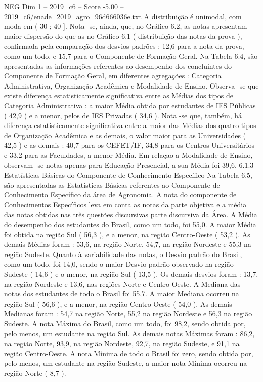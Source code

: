 \begin{textsample}{NEG Dim 1 – 2019\_c6 – Score -5.00 – 2019\_c6/enade\_2019\_agro\_96d666036e.txt}
A distribuição é unimodal, com moda em ( 30 ; 40 ].
Nota -se, ainda, que, no Gráfico 6.2, as notas apresentam maior dispersão do que as no Gráfico 6.1 ( distribuição das notas da prova ), confirmada pela comparação dos desvios padrões : 12,6 para a nota da prova, como um todo, e 15,7 para o Componente de Formação Geral.
Na Tabela 6.4, são apresentadas as informações referentes ao desempenho dos concluintes do Componente de Formação Geral, em diferentes agregações : Categoria Administrativa, Organização Acadêmica e Modalidade de Ensino.
Observa -se que existe diferença estatisticamente significativa entre as Médias dos tipos de Categoria Administrativa : a maior Média obtida por estudantes de IES Públicas ( 42,9 ) e a menor, pelos de IES Privadas ( 34,6 ).
Nota -se que, também, há diferença estatisticamente significativa entre a maior das Médias dos quatro tipos de Organização Acadêmica e as demais, o valor maior para as Universidades ( 42,5 ) e as demais : 40,7 para os CEFET/IF, 34,8 para os Centros Universitários e 33,2 para as Faculdades, a menor Média.
Em relaçao a Modalidade de Ensino, observam -se notas apenas para Educação Presencial, a sua Média foi 39,6. 6.1.3 Estatísticas Básicas do Componente de Conhecimento Específico Na Tabela 6.5, são apresentadas as Estatísticas Básicas referentes ao Componente de Conhecimento Específico da área de Agronomia.
A nota do componente de Conhecimentos Específicos leva em conta as notas da parte objetiva e a média das notas obtidas nas três questões discursivas parte discursiva da Área.
A Média do desempenho dos estudantes do Brasil, como um todo, foi 55,0.
A maior Média foi obtida na região Sul ( 56,3 ), e a menor, na região Centro-Oeste ( 53,2 ).
As demais Médias foram : 53,6, na região Norte, 54,7, na região Nordeste e 55,3 na região Sudeste.
Quanto à variabilidade das notas, o Desvio padrão do Brasil, como um todo, foi 14,0, sendo o maior Desvio padrão observado na região Sudeste ( 14,6 ) e o menor, na região Sul ( 13,5 ).
Os demais desvios foram : 13,7, na região Nordeste e 13,6, nas regiões Norte e Centro-Oeste.
A Mediana das notas dos estudantes de todo o Brasil foi 55,7.
A maior Mediana ocorreu na região Sul ( 56,6 ), e a menor, na região Centro-Oeste ( 54,0 ).
As demais Medianas foram : 54,7 na região Norte, 55,2 na região Nordeste e 56,3 na região Sudeste.
A nota Máxima do Brasil, como um todo, foi 98,2, sendo obtida por, pelo menos, um estudante na região Sul.
As demais notas Máximas foram : 86,2, na região Norte, 93,9, na região Nordeste, 92,7, na região Sudeste, e 91,1 na região Centro-Oeste.
A nota Mínima de todo o Brasil foi zero, sendo obtida por, pelo menos, um estudante na região Sudeste, a maior nota Mínima ocorreu na região Norte ( 8,7 ).

\end{textsample}
